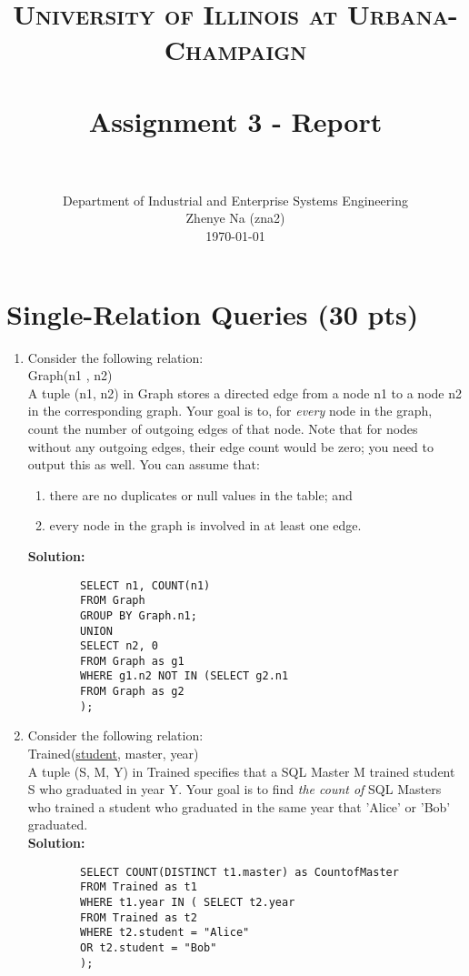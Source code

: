 \documentclass[paper=a4, fontsize=11pt]{scrartcl}
\title{
	\usefont{OT1}{bch}{b}{n}
	\normalfont \normalsize \textsc{University of Illinois at Urbana-Champaign} \\ [25pt]
	\horrule{0.5pt} \\[0.4cm]
	\huge Assignment 3 - Report \\
	\horrule{2pt} \\[0.5cm]
}
\author{
	\normalfont 								\normalsize
	Department of Industrial and Enterprise Systems Engineering\\
	\normalsize Zhenye Na (zna2)\\[-3pt]		\normalsize
	\today
}
\date{}
\numberwithin{equation}{section}		%
\numberwithin{figure}{section}			%
\numberwithin{table}{section}				%
\begin{document}
	\maketitle
	
	\section{Single-Relation Queries (30 pts)}
	
	\begin{enumerate}
		\item Consider the following relation:\\
		Graph(n1 , n2)\\
		A tuple (n1, n2) in Graph stores a directed edge from a node n1 to a node n2 in the corresponding graph. Your goal is to, for \textit{every} node in the graph, count the number of outgoing edges of that node. Note that for nodes without any outgoing edges, their edge count would be zero; you need to output this as well.
		You can assume that:
		\begin{enumerate}
			\item there are no duplicates or null values in the table; and
			\item every node in the graph is involved in at least one edge.
		\end{enumerate}
		
		\textbf{Solution: }
		\begin{lstlisting}
		SELECT n1, COUNT(n1)
		FROM Graph
		GROUP BY Graph.n1;
		UNION
		SELECT n2, 0
		FROM Graph as g1
		WHERE g1.n2 NOT IN (SELECT g2.n1
		FROM Graph as g2     
		);
		\end{lstlisting}
		
		
		\item Consider the following relation:\\
		Trained(\underline{student}, master, year)\\
		A tuple (S, M, Y) in Trained specifies that a SQL Master M trained student S who graduated in year Y. Your goal is to find \textit{the count of} SQL Masters who trained a student who graduated in the same year that 'Alice' or 'Bob' graduated.\\
		\textbf{Solution: }
		\begin{lstlisting}
		SELECT COUNT(DISTINCT t1.master) as CountofMaster
		FROM Trained as t1
		WHERE t1.year IN ( SELECT t2.year
		FROM Trained as t2
		WHERE t2.student = "Alice" 
		OR t2.student = "Bob"
		);
		\end{lstlisting}
		

\end{enumerate}
\end{document}
